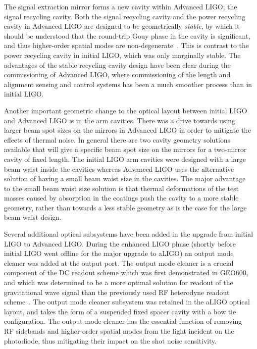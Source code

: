 The signal extraction mirror forms a new cavity within Advanced LIGO; the signal recycling cavity. 
Both the signal recycling cavity and the power recycling cavity in Advanced LIGO are designed to be 
geometrically \emph{stable}, by which it should be understood that the round-trip Gouy phase in the cavity 
is significant, and thus higher-order spatial modes are non-degenerate~\cite{Arain2008}. 
This is contrast to the power recycling cavity in initial LIGO, which was only marginally stable. 
The advantages of the stable recycling cavity design have been clear during the commissioning of 
Advanced LIGO, where commissioning of the length and alignment sensing and control systems has 
been a much smoother process than in initial LIGO. 

Another important geometric change to the optical layout between initial LIGO and Advanced LIGO is 
in the arm cavities. There was a drive towards using larger beam spot sizes on the mirrors in Advanced 
LIGO in order to mitigate the effects of thermal noise. In general there are two cavity geometry solutions available 
that will give a specific beam spot size on the mirrors for a two-mirror cavity of fixed length. The initial LIGO 
arm cavities were designed with a large beam waist inside the cavities
whereas Advanced LIGO uses the alternative solution of having a small beam waist size in the cavities. 
The major advantage to the small beam waist size solution is that thermal deformations of the test masses caused by 
absorption in the coatings push the cavity to a more stable geometry, rather than towards a less stable geometry as 
is the case for the large beam waist design. 

Several additional optical subsystems have been added in the upgrade from initial LIGO to Advanced LIGO. 
During the enhanced LIGO phase (shortly before initial LIGO went offline for the major upgrade to aLIGO) an output
mode cleaner was added at the output port. The output mode cleaner is a crucial component of the DC readout 
scheme which was first demonstrated in GEO600, and which was determined to be a more optimal solution for 
readout of the gravitational wave signal than the previously used RF heterodyne readout scheme~\cite{DCreadout}. The output mode 
cleaner subsystem was retained in the aLIGO optical layout, and takes the form of a suspended fixed spacer cavity 
with a bow tie configuration. The output mode cleaner has the essential function of removing RF sidebands and higher-order 
spatial modes from the light incident on the photodiode, thus mitigating their impact on the shot noise sensitivity. 

